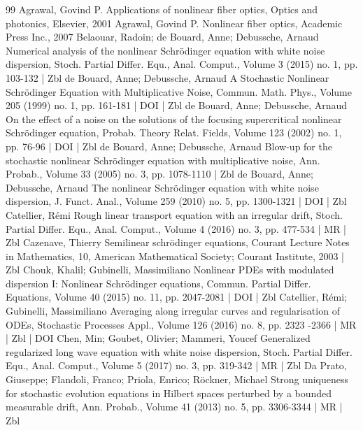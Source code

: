 \begin{thebibliography}{99}
Agrawal, Govind P. Applications of nonlinear fiber optics, Optics and photonics, Elsevier, 2001
Agrawal, Govind P. Nonlinear fiber optics, Academic Press Inc., 2007
Belaouar, Radoin; de Bouard, Anne; Debussche, Arnaud Numerical analysis of the nonlinear Schrödinger equation with white noise dispersion, Stoch. Partial Differ. Equ., Anal. Comput., Volume 3 (2015) no. 1, pp. 103-132 | Zbl
de Bouard, Anne; Debussche, Arnaud A Stochastic Nonlinear Schrödinger Equation with Multiplicative Noise, Commun. Math. Phys., Volume 205 (1999) no. 1, pp. 161-181 | DOI | Zbl
de Bouard, Anne; Debussche, Arnaud On the effect of a noise on the solutions of the focusing supercritical nonlinear Schrödinger equation, Probab. Theory Relat. Fields, Volume 123 (2002) no. 1, pp. 76-96 | DOI | Zbl
de Bouard, Anne; Debussche, Arnaud Blow-up for the stochastic nonlinear Schrödinger equation with multiplicative noise, Ann. Probab., Volume 33 (2005) no. 3, pp. 1078-1110 | Zbl
de Bouard, Anne; Debussche, Arnaud The nonlinear Schrödinger equation with white noise dispersion, J. Funct. Anal., Volume 259 (2010) no. 5, pp. 1300-1321 | DOI | Zbl
Catellier, Rémi Rough linear transport equation with an irregular drift, Stoch. Partial Differ. Equ., Anal. Comput., Volume 4 (2016) no. 3, pp. 477-534 | MR | Zbl
Cazenave, Thierry Semilinear schrödinger equations, Courant Lecture Notes in Mathematics, 10, American Mathematical Society; Courant Institute, 2003 | Zbl
Chouk, Khalil; Gubinelli, Massimiliano Nonlinear PDEs with modulated dispersion I: Nonlinear Schrödinger equations, Commun. Partial Differ. Equations, Volume 40 (2015) no. 11, pp. 2047-2081 | DOI | Zbl
Catellier, Rémi; Gubinelli, Massimiliano Averaging along irregular curves and regularisation of ODEs, Stochastic Processes Appl., Volume 126 (2016) no. 8, pp. 2323 -2366 | MR | Zbl | DOI
Chen, Min; Goubet, Olivier; Mammeri, Youcef Generalized regularized long wave equation with white noise dispersion, Stoch. Partial Differ. Equ., Anal. Comput., Volume 5 (2017) no. 3, pp. 319-342 | MR | Zbl
Da Prato, Giuseppe; Flandoli, Franco; Priola, Enrico; Röckner, Michael Strong uniqueness for stochastic evolution equations in Hilbert spaces perturbed by a bounded measurable drift, Ann. Probab., Volume 41 (2013) no. 5, pp. 3306-3344 | MR | Zbl

\end{thebibliography}
